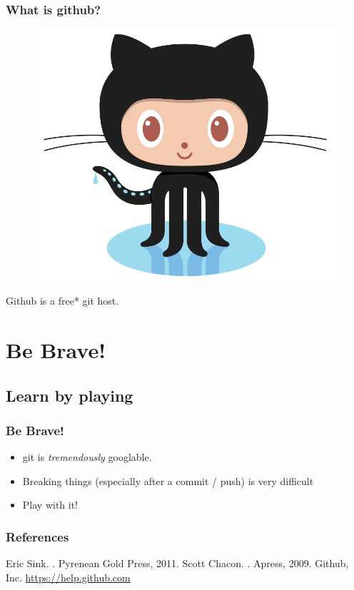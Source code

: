 \documentclass[handout]{beamer}
\begin{document}
\begin{frame}
\frametitle{What is github?}

\begin{figure}[!t] \centering
\includegraphics[width=.4\textwidth]{figures/octocat}
\end{figure}

Github is a \alert{free*} git host.

\begin{itemize}
\end{itemize}
\end{frame}

\section{Be Brave!}
\subsection[Learn by playing]{Learn by playing}
\begin{frame}
\frametitle{Be Brave!}
\begin{itemize}
\item git is \emph{tremendously} googlable.
\item Breaking things (especially after a commit / push) is very difficult
\item Play with it!
\end{itemize}
\end{frame}

\begin{frame}[allowframebreaks]
  \frametitle<presentation>{References}    
  \begin{thebibliography}{10}    
  \beamertemplatebookbibitems
    Eric Sink.
    .
    \newblock Pyrenean Gold Press, 2011.
    Scott Chacon.
    .
    \newblock Apress, 2009.
  \beamertemplatearticlebibitems
    Github, Inc.
    \newblock \url{https://help.github.com}
  \end{thebibliography}
\end{frame}
\end{document}
